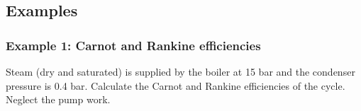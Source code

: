 \documentclass[10pt,compress]{beamer}
\begin{document}
\begin{frame}
\begin{columns}
\begin{column}[c]{0.5\linewidth}
{\begin{figure}
\begin{center}
           \end{center}
         \end{figure}}
      \end{column}
   \end{columns}
 \normalsize
\end{frame}

\subsection{Examples}

\begin{frame}
 \frametitle{Example 1: Carnot and Rankine efficiencies}
    Steam (dry and saturated) is supplied by the boiler at 15 bar and the condenser pressure is 0.4 bar. Calculate the Carnot and Rankine efficiencies of the cycle. Neglect the pump work.
\end{frame}
\end{document}
